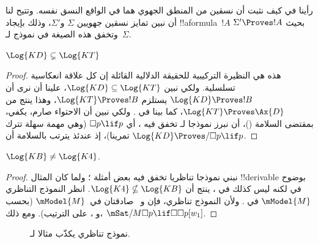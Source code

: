 \documentclass[../../../include/open-logic-section]{subfiles}
\begin{document}


رأينا في  كيف نثبت أن نسقين من المنطق الجهوي هما في
الواقع النسق نفسه. وتتيح لنا  أن نبين تمايز
نسقين جهويين $\Sigma$ و$\Sigma'$، وذلك بإيجاد !!a{formula}~$!A$ بحيث
$\Sigma' \Proves !A$ وتخفق هذه الصيغة في نموذج لـ~$\Sigma$.

\begin{prop}
  $\Log{KD} \subsetneq \Log{KT}$
\end{prop}

\begin{proof} هذه هي النظيرة التركيبية للحقيقة الدلالية القائلة إن كل
  علاقة انعكاسية تسلسلية. ولكي نبين $\Log{KD} \subseteq \Log{KT}$،
  علينا أن نرى أن $\Log{KD} \Proves !B$ يستلزم $\Log{KT} \Proves
  !B$، وهذا ينتج من $\Log{KT} \Proves \Ax{D}$، كما بينا في
  . ولكي نبين
  أن الاحتواء صارم، يكفي، بمقتضى السلامة
  ()، أن نبرز نموذجا لـ تخفق فيه
  ، أي $\Box p \lif p$ (وهي مهمة سهلة تترك تمرينا)، إذ عندئذ
  يترتب بالسلامة أن $\Log{KD} \Proves/ \Box p \lif p$.
\end{proof}

\begin{prop}
  $\Log{KB} \neq \Log{K4}$.
\end{prop}

\begin{proof}
  نبني نموذجا تناظريا تخفق فيه بعض أمثلة ؛ ولما كان المثال
  !!{derivable} بوضوح في  لكنه ليس كذلك في ، ينتج
  أن $\Log{K4} \nsubseteq \Log{KB}$. انظر النموذج التناظري
  $\mModel{M}$ في . ولأن النموذج تناظري، فإن
   و~ صادقتان في~$\mModel{M}$ (بحسب
   و
  ، على الترتيب). ومع ذلك،
  $\mSat/{M}{\Box p \lif \Box\Box p}[w_1]$.
\end{proof}

\begin{figure}[htpb]
  \centering
  \caption{نموذج تناظري يكذّب مثالا لـ.}
\end{figure}
 
\end{document}
